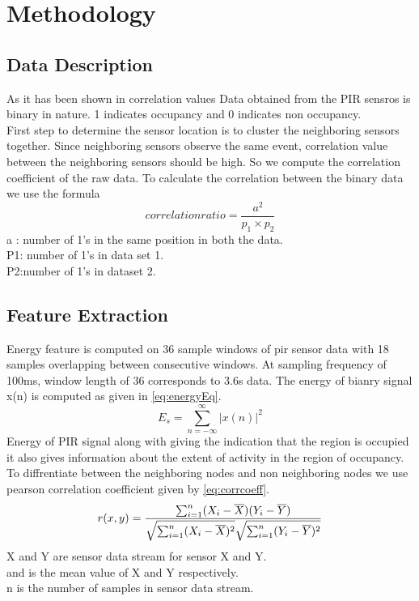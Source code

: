 \chapter{Methodology}

\section{Data Description}
As it has been shown in \cite{Hong:2013:TAS:2528282.2528302} correlation values 
Data obtained from the PIR sensros is binary in nature. 1 indicates occupancy and 0 indicates non occupancy. \\
First step to determine the sensor location is to cluster the neighboring sensors together. Since neighboring sensors observe the same event, correlation value between the neighboring sensors should be high. So we compute the correlation coefficient of the raw data. To calculate the correlation between the binary data we use  the formula 
\begin{equation}
correlation ratio = \frac{a^2}{p_1\times p_2}
\end{equation}
a : number of 1’s in the same position in both the data.\\
P1: number of 1’s in data set 1.\\
P2:number of 1’s in dataset 2.\\

\section{Feature Extraction}
Energy feature is computed on 36 sample windows of pir sensor data with 18 samples overlapping between consecutive windows. At sampling frequency of 100ms, window length of 36 corresponds to 3.6s data.
The energy of bianry signal x(n) is computed as given in \ref{eq:energyEq}.\\
\begin{equation}
\label{eq:energyEq}
E_s = {\sum_{n=-\infty}^{\infty}{|x(n)|}^2}
\end{equation}
Energy of PIR signal along with giving the indication that the region is occupied it also gives information about the extent of activity in the region of occupancy. To diffrentiate between the neighboring nodes and non neighboring nodes we use pearson correlation coefficient given by \ref{eq:corrcoeff}. 
\begin{equation}
\label{eq:corrcoeff}
r(x,y)=\frac{\sum_{i=1}^{n}(X_i-\overline{X})(Y_i-\overline{Y})}{\sqrt{\sum_{i=1}^{n}(X_i-\overline{X})^2}\sqrt{\sum_{i=1}^{n}(Y_i-\overline{Y})^2}} \\
\end{equation}
X and Y are sensor data stream for sensor X and Y.\\
 and  is the mean value of X and Y respectively.\\
n is the number of samples in sensor data stream.\\


 


